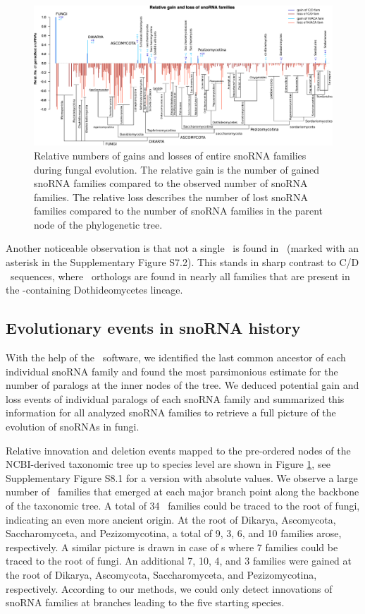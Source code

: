 \begin{figure}
  \centering
  \includegraphics[width=\textwidth]{pics/fungi_relative_gain_loss_PAPERVERSION.eps}
  \caption{Relative numbers of gains and losses of entire snoRNA
    families during fungal evolution. The relative gain is the number
    of gained snoRNA families compared to the observed number of
    snoRNA families. The relative loss describes the number of lost
    snoRNA families compared to the number of snoRNA families in the
    parent node of the phylogenetic tree.}
\label{fig:relative_innovation_deletion_event}
\end{figure}

Another noticeable observation is that not a single \haca\ is found in
\Ptt\ (marked with an asterisk in the Supplementary Figure S7.2). This
stands in sharp contrast to C/D \sno\ sequences, where \ptt\ orthologs
are found in nearly all families that are present in the
\ptt-containing Dothideomycetes lineage.

\subsection{Evolutionary events in snoRNA history}

With the help of the \epope\ software, we identified the last common
ancestor of each individual snoRNA family and found the most
parsimonious estimate for the number of paralogs at the inner nodes of
the tree.  We deduced potential gain and loss events of individual paralogs of
each snoRNA family and summarized this information for all analyzed
snoRNA families to retrieve a full picture of the evolution of snoRNAs
in fungi.

Relative innovation and deletion events mapped to the pre-ordered
nodes of the NCBI-derived taxonomic tree up to species level are shown
in Figure \ref{fig:relative_innovation_deletion_event}, see
Supplementary Figure S8.1 for a version with absolute values.  We
observe a large number of \sno\ families that emerged at each major
branch point along the backbone of the taxonomic tree. A total of 34
\cd\ families could be traced to the root of fungi, indicating an even
more ancient origin. At the root of Dikarya, Ascomycota,
Saccharomyceta, and Pezizomycotina, a total of 9, 3, 6, and 10
families arose, respectively. A similar picture is drawn in case of
\haca s where 7 families could be traced to the root of fungi. An
additional 7, 10, 4, and 3 families were gained at the root of Dikarya,
Ascomycota, Saccharomyceta, and Pezizomycotina, respectively.  According to our
methods, we could only detect innovations of snoRNA families at
branches leading to the five starting species.

